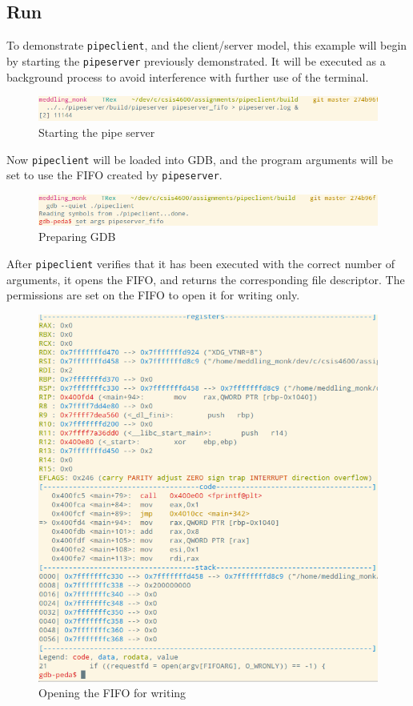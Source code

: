 \documentclass[letter,12pt,sffamily]{article}
\begin{document}
\subsection{Run}
To demonstrate \texttt{pipeclient}, and the client/server model, this example will begin by starting the \texttt{pipeserver} previously demonstrated.
It will be executed as a background process to avoid interference with further use of the terminal.
\begin{figure}[H]
	\centering
	\includegraphics[width=1\linewidth]{./images/15}
	\caption[starting_pipe_server]{Starting the pipe server}
	\label{fig:16}
\end{figure}
Now \texttt{pipeclient} will be loaded into GDB, and the program arguments will be set to use the FIFO created by \texttt{pipeserver}.
\begin{figure}[H]
	\centering
	\includegraphics[width=1\linewidth]{./images/16}
	\caption[preparing_gdb]{Preparing GDB}
	\label{fig:17}
\end{figure}
After \texttt{pipeclient} verifies that it has been executed with the correct number of arguments, it opens the FIFO, and returns
the corresponding file descriptor. The permissions are set on the FIFO to open it for writing only.
\begin{figure}[H]
	\centering
	\includegraphics[width=1\linewidth]{./images/17}
	\caption[opening_fifo]{Opening the FIFO for writing}
	\label{fig:18}
\end{figure}
\end{document}
